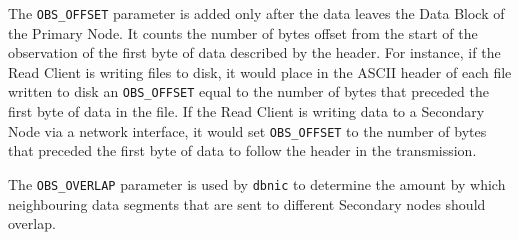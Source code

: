 The {\tt OBS\_OFFSET} parameter is added only after the data leaves
the Data Block of the Primary Node.  It counts the number of bytes
offset from the start of the observation of the first byte of data
described by the header.  For instance, if the Read Client is writing
files to disk, it would place in the ASCII header of each file written
to disk an {\tt OBS\_OFFSET} equal to the number of bytes that
preceded the first byte of data in the file.  If the Read Client is
writing data to a Secondary Node via a network interface, it would set
{\tt OBS\_OFFSET} to the number of bytes that preceded the first byte
of data to follow the header in the transmission.

The {\tt OBS\_OVERLAP} parameter is used by {\tt dbnic} to determine
the amount by which neighbouring data segments that are sent to
different Secondary nodes should overlap.


